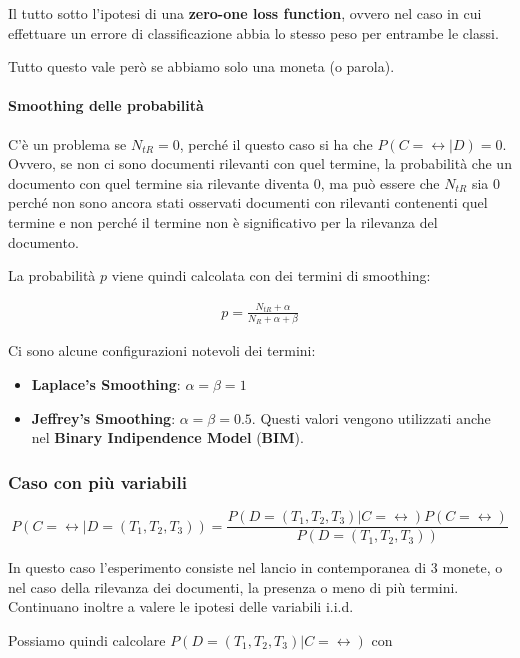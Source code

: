 Il tutto sotto l'ipotesi di una \textbf{zero-one loss function}, ovvero nel caso in cui effettuare un errore di classificazione abbia lo stesso peso per entrambe le classi.

Tutto questo vale però se abbiamo solo una moneta (o parola).

\paragraph{Smoothing delle probabilità} C'è un problema se $N_{tR} = 0$, perché il questo caso si ha che $P(C = \rel | D) = 0$. Ovvero, se non ci sono documenti rilevanti con quel termine, la probabilità che un documento con quel termine sia rilevante diventa 0, ma può essere che $N_{tR}$ sia 0 perché non sono ancora stati osservati documenti con rilevanti contenenti quel termine e non perché il termine non è significativo per la rilevanza del documento.

La probabilità $p$ viene quindi calcolata con dei termini di smoothing:

\begin{align}
	p = \frac{N_{tR} + \alpha}{N_R + \alpha + \beta} \label{eq:smoothing}
\end{align}

Ci sono alcune configurazioni notevoli dei termini:

\begin{itemize}
	\item \textbf{Laplace's Smoothing}: $\alpha = \beta = 1$
	\item \textbf{Jeffrey's Smoothing}: $\alpha = \beta = 0.5$. Questi valori vengono utilizzati anche nel \textbf{Binary Indipendence Model} (\textbf{BIM}).
\end{itemize}


\subsubsection{Caso con più variabili}

$$
P(C = \rel | D=(T_1, T_2, T_3)) = \frac{P(D=(T_1,T_2, T_3) | C=\rel)P(C=\rel)}{P(D=(T_1, T_2, T_3))}
$$

\noindent In questo caso l'esperimento consiste nel lancio in contemporanea di 3 monete, o nel caso della rilevanza dei documenti, la presenza o meno di più termini.
Continuano inoltre a valere le ipotesi delle variabili i.i.d.

Possiamo quindi calcolare $P(D=(T_1,T_2, T_3) | C=\rel)$ con

